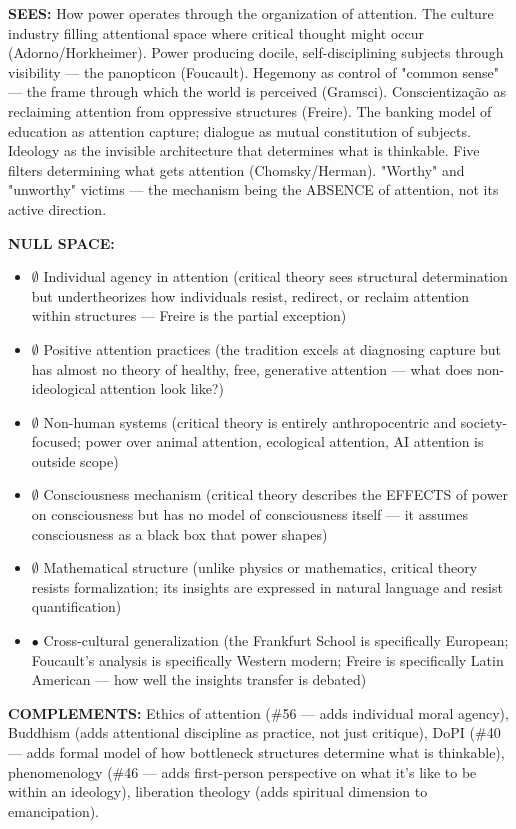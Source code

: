 \textbf{SEES:} How power operates through the organization of attention. The culture industry filling attentional space where critical thought might occur (Adorno/\allowbreak Horkheimer). Power producing docile, self-disciplining subjects through visibility — the panopticon (Foucault). Hegemony as control of "common sense" — the frame through which the world is perceived (Gramsci). Conscientização as reclaiming attention from oppressive structures (Freire). The banking model of education as attention capture; dialogue as mutual constitution of subjects. Ideology as the invisible architecture that determines what is thinkable. Five filters determining what gets attention (Chomsky/\allowbreak Herman). "Worthy" and "unworthy" victims — the mechanism being the ABSENCE of attention, not its active direction.


\textbf{NULL SPACE:}

\begin{itemize}[nosep,leftmargin=*]
  \item $\emptyset$ Individual agency in attention (critical theory sees structural determination but undertheorizes how individuals resist, redirect, or reclaim attention within structures — Freire is the partial exception)
  \item $\emptyset$ Positive attention practices (the tradition excels at diagnosing capture but has almost no theory of healthy, free, generative attention — what does non-ideological attention look like?)
  \item $\emptyset$ Non-human systems (critical theory is entirely anthropocentric and society-focused; power over animal attention, ecological attention, AI attention is outside scope)
  \item $\emptyset$ Consciousness mechanism (critical theory describes the EFFECTS of power on consciousness but has no model of consciousness itself — it assumes consciousness as a black box that power shapes)
  \item $\emptyset$ Mathematical structure (unlike physics or mathematics, critical theory resists formalization; its insights are expressed in natural language and resist quantification)
  \item $\bullet$ Cross-cultural generalization (the Frankfurt School is specifically European; Foucault's analysis is specifically Western modern; Freire is specifically Latin American — how well the insights transfer is debated)
\end{itemize}


\textbf{COMPLEMENTS:} Ethics of attention (\#56 — adds individual moral agency), Buddhism (adds attentional discipline as practice, not just critique), DoPI (\#40 — adds formal model of how bottleneck structures determine what is thinkable), phenomenology (\#46 — adds first-person perspective on what it's like to be within an ideology), liberation theology (adds spiritual dimension to emancipation).


